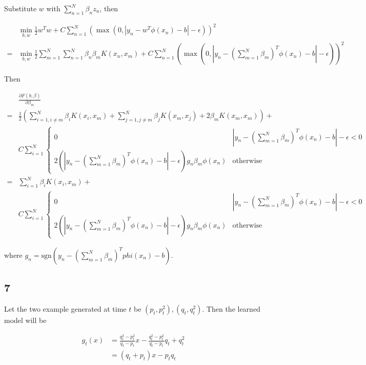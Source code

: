 \documentclass[fleqn,a4paper,12pt]{article}
\begin{document}
Substitute $w$ with $\sum_{n=1}^N \beta_n z_n$, then 

\begin{align*}
  &  \min_{b, w} \frac{1}{2} w^T w + C \sum_{n=1}^N (\max(0, |y_n - w^T \phi(x_n) - b| - \epsilon))^2 \\
  =& \min_{b, w} \frac{1}{2} \sum_{m=1}^N \sum_{n=1}^N \beta_n \beta_m K(x_n, x_m) + C \sum_{n=1}^N (\max(0, |y_n - (\sum_{m=1}^N \beta_m)^T \phi(x_n)  - b| - \epsilon))^2
\end{align*}


Then

\begin{align*}
  &  \frac{\partial F(b, \beta)}{\partial \beta_m} \\
  =& \frac{1}{2} (\sum_{i=1, i \ne m}^N \beta_i K(x_i, x_m) + \sum_{j=1, j \ne m}^N \beta_j K(x_m, x_j) + 2 \beta_m K(x_m, x_m)) + \\
  & C \sum_{i=1}^N \begin{cases}
    0 & |y_n - (\sum_{m=1}^N \beta_m)^T \phi(x_n)  - b| - \epsilon < 0 \\
    2(|y_n - (\sum_{m=1}^N \beta_m)^T \phi(x_n)  - b| - \epsilon) g_n \beta_m \phi(x_n) & \text{otherwise}
  \end{cases} \\
  =& \sum_{i=1}^N \beta_i K(x_i, x_m)  + \\
  & C \sum_{i=1}^N \begin{cases}
    0 & |y_n - (\sum_{m=1}^N \beta_m)^T \phi(x_n)  - b| - \epsilon < 0 \\
    2(|y_n - (\sum_{m=1}^N \beta_m)^T \phi(x_n)  - b| - \epsilon) g_n \beta_m \phi(x_n) & \text{otherwise}
  \end{cases}
\end{align*}


where $g_n = \mathrm{sgn}(y_n - (\sum_{m=1}^N \beta_m)^T phi(x_n)  - b)$.

\subsection*{7}

Let the two example generated at time $t$ be $(p_t, p_t^2), (q_t, q_t^2)$. Then the learned model will be

\begin{align*}
  g_t(x)
  &= \frac{q_t^2 - p_t^2}{q_t - p_t} x - \frac{q_t^2 - p_t^2}{q_t - p_t} q_t + q_t^2 \\
  &= (q_t + p_t) x - p_t q_t
\end{align*}
\end{document}

